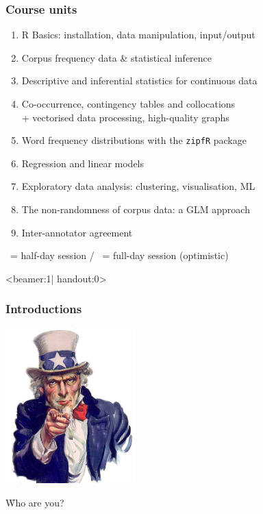 \documentclass[t]{beamer} %
\begin{document}
{
\newcommand{\halfday}{\primary{\textsc{(h)}}}
\newcommand{\fullday}{\primary{\textsc{(f)}}}
\begin{frame}
  \frametitle{Course units}
  
  \begin{enumerate}
  \item R Basics: installation, data manipulation, input/output \halfday
  \item Corpus frequency data \& statistical inference \halfday
  \item Descriptive and inferential statistics for continuous data \fullday
  \item Co-occurrence, contingency tables and collocations \fullday\\
    + vectorised data processing, high-quality graphs
  \item Word frequency distributions with the \texttt{zipfR} package \halfday
  \item Regression and linear models \fullday
  \item Exploratory data analysis: clustering, visualisation, ML \halfday
  \item The non-randomness of corpus data: a GLM  approach \halfday
  \item Inter-annotator agreement \halfday
  \end{enumerate}

  \gap
  \halfday\ = half-day session / \fullday\ = full-day session (optimistic)
\end{frame}
}

\begin{frame}<beamer:1| handout:0>
  \frametitle{Introductions}

  \begin{center}
    \vspace{-5mm}
    \includegraphics[height=6cm]{img/uncle-sam-wants-you-cutout}

    \vspace{5mm}
    \begin{Large}
      \h{Who are you?}
    \end{Large}
  \end{center}
\end{frame}
\end{document}
